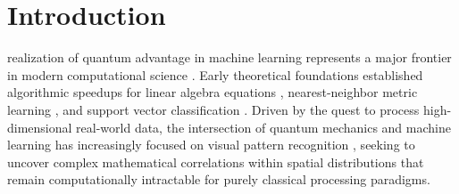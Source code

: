 \documentclass[journal]{IEEEtran}
\begin{document}
\IEEEpeerreviewmaketitle

\newpage

\section{Introduction}
 realization of quantum advantage in machine learning represents a major frontier in modern computational science \cite{biamonte2017quantum, schuld2015introduction, dunjko2018machine, cerezo2021variational, lloyd2020quantum}. Early theoretical foundations established algorithmic speedups for linear algebra equations \cite{harrow2009quantum}, nearest-neighbor metric learning \cite{wiebe2012quantum}, and support vector classification \cite{rebentrost2014quantum}. Driven by the quest to process high-dimensional real-world data, the intersection of quantum mechanics and machine learning has increasingly focused on visual pattern recognition \cite{cong2019quantum, henderson2020quanvolutional, chen2023qcnn}, seeking to uncover complex mathematical correlations within spatial distributions that remain computationally intractable for purely classical processing paradigms.
\end{document}
